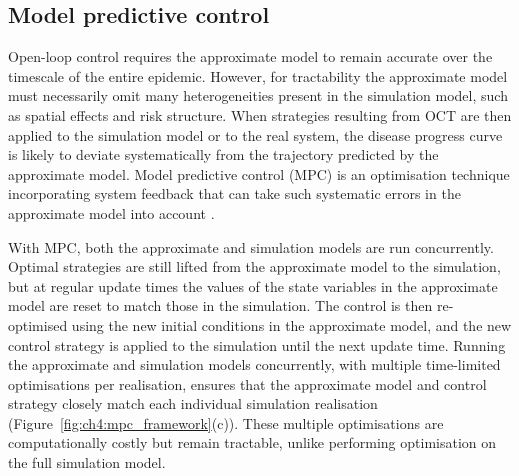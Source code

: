 \subsection{Model predictive control}

Open-loop control requires the approximate model to remain accurate over the timescale of the entire epidemic. However, for tractability the approximate model must necessarily omit many heterogeneities present in the simulation model, such as spatial effects and risk structure. When strategies resulting from OCT are then applied to the simulation model or to the real system, the disease progress curve is likely to deviate systematically from the trajectory predicted by the approximate model. Model predictive control (MPC) is an optimisation technique incorporating system feedback that can take such systematic errors in the approximate model into account \citep{camacho_model_1995, lee_model_2011}.

With MPC, both the approximate and simulation models are run concurrently. Optimal strategies are still lifted from the approximate model to the simulation, but at regular update times the values of the state variables in the approximate model are reset to match those in the simulation. The control is then re-optimised using the new initial conditions in the approximate model, and the new control strategy is applied to the simulation until the next update time. Running the approximate and simulation models concurrently, with multiple time-limited optimisations per realisation, ensures that the approximate model and control strategy closely match each individual simulation realisation (Figure~\ref{fig:ch4:mpc_framework}(c)). These multiple optimisations are computationally costly but remain tractable, unlike performing optimisation on the full simulation model.

